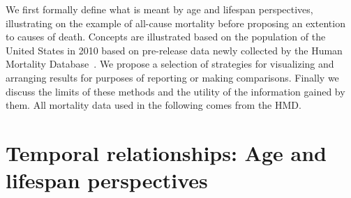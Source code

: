 \documentclass{article}
\begin{document}
We first formally define what is meant by age and lifespan
perspectives, illustrating on the example of all-cause
mortality before proposing an extention to causes of death. Concepts are
illustrated based on the population of the United States in 2010 based on pre-release
data newly collected by the Human Mortality
Database~. We propose
a selection of strategies for visualizing and arranging results for purposes of
reporting or making comparisons. Finally we discuss the limits of these methods
and the utility of the information gained by them. All mortality data used in
the following comes from the HMD.

\section*{Temporal relationships: Age and lifespan perspectives}

\end{document}
